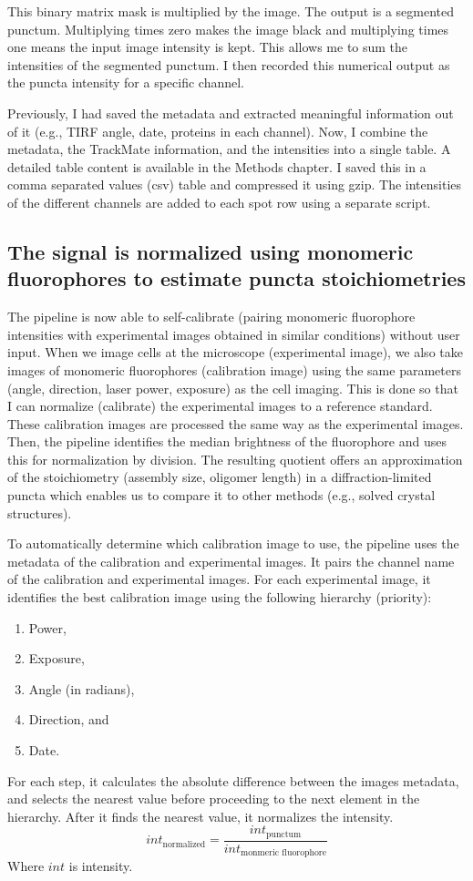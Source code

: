 This binary matrix mask is multiplied by the image. The output is a segmented punctum. Multiplying times zero makes the image black and multiplying times one means the input image intensity is kept. This allows me to sum the intensities of the segmented punctum. I then recorded this numerical output as the puncta intensity for a specific channel.

Previously, I had saved the metadata and extracted meaningful information out of it (e.g., TIRF angle, date, proteins in each channel). Now, I combine the metadata, the TrackMate information, and the intensities into a single table. A detailed table content is available in the Methods chapter. I saved this in a comma separated values (csv) table and compressed it using gzip. The intensities of the different channels are added to each spot row using a separate script.

\subsection{The signal is normalized using monomeric fluorophores to estimate puncta stoichiometries}
\label{subsection:normalization}
The pipeline is now able to self-calibrate (pairing monomeric fluorophore intensities with experimental images obtained in similar conditions) without user input. When we image cells at the microscope (experimental image), we also take images of monomeric fluorophores (calibration image) using the same parameters (angle, direction, laser power, exposure) as the cell imaging. This is done so that I can normalize (calibrate) the experimental images to a reference standard. These calibration images are processed the same way as the experimental images. Then, the pipeline identifies the median brightness of the fluorophore and uses this for normalization by division. The resulting quotient offers an approximation of the stoichiometry (assembly size, oligomer length) in a diffraction-limited puncta which enables us to compare it to other methods (e.g., solved crystal structures).

To automatically determine which calibration image to use, the pipeline uses the metadata of the calibration and experimental images. It pairs the channel name of the calibration and experimental images. For each experimental image, it identifies the best calibration image using the following hierarchy (priority):
\begin{enumerate}
\item Power,
\item Exposure,
\item Angle (in radians),
\item Direction, and
\item Date.
\end{enumerate}
For each step, it calculates the absolute difference between the images metadata, and selects the nearest value before proceeding to the next element in the hierarchy. After it finds the nearest value, it normalizes the intensity. \begin{equation*}int_{\text{normalized}} = \frac{int_{\text{punctum}}}{int_{\text{monmeric fluorophore}}}\end{equation*}
Where $int$ is intensity.
